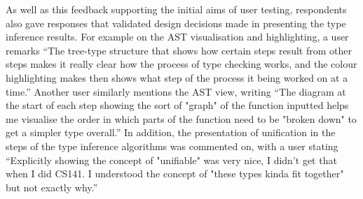 \documentclass[a4paper,fleqn,12pt]{article}
\begin{document}
As well as this feedback supporting the initial aims of user testing, respondents also gave responses that validated design decisions made in presenting the type inference results. For example on the AST visualisation and highlighting, a user remarks “The tree-type structure that shows how certain steps result from other steps makes it really clear how the process of type checking works, and the colour highlighting makes then shows what step of the process it being worked on at a time.” Another user similarly mentions the AST view, writing “The diagram at the start of each step showing the sort of "graph" of the function inputted helps me visualise the order in which parts of the function need to be "broken down" to get a simpler type overall.” In addition, the presentation of unification in the steps of the type inference algorithms was commented on, with a user stating “Explicitly showing the concept of "unifiable" was very nice, I didn't get that when I did CS141. I understood the concept of "these types kinda fit together" but not exactly why.”
\end{document}
